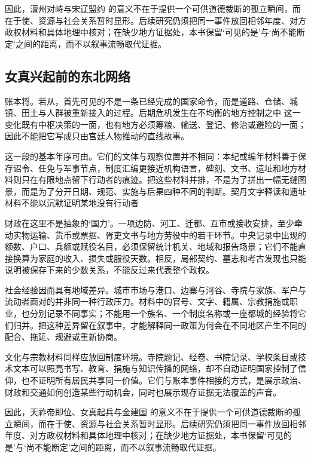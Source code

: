 因此，澶州对峙与宋辽盟约 的意义不在于提供一个可供道德裁断的孤立瞬间，而在于使、资源与社会关系暂时显形。后续研究仍须把同一事件放回相邻年度、对方政权材料和具体地理中核对；在缺少地方证据处，本书保留‘可见的是’与‘尚不能断定’之间的距离，而不以叙事流畅取代证据。

\subsection{女真兴起前的东北网络}

账本将。若从，首先可见的不是一条已经完成的国家命令，而是道路、仓储、城镇、田土与人群被重新接入的过程。后期危机发生在不均衡的地方控制之中 这一变化既有中枢决策的一面，也有地方必须筹粮、输送、登记、修治或避险的一面；因此不能把它写成只由宫廷人物推动的直线故事。

这一段的基本年序可由。它们的文体与观察位置并不相同：本纪或编年材料善于保存诏令、任免与军事节点，制度汇编更接近机构语言，碑刻、文书、遗址和地方材料则只在有限地点留下行动者的痕迹。把这些材料并排，不是为了拼出一幅无缝图景，而是为了分开日期、规范、实施与后果四种不同的判断。契丹文字释读和遗址材料不能以沉默证明某地没有行动者

财政在这里不是抽象的‘国力’。一项边防、河工、迁都、互市或接收安排，至少牵动实物运输、货币或票据、胥吏文书与地方劳役中的若干环节。中央记录中出现的额数、户口、兵额或赋役名目，必须保留统计机关、地域和报告场景；它们不能直接换算为家庭的收入、损失或服役天数。相反，局部契约、墓志和考古发现也只能说明被保存下来的少数关系，不能反过来代表整个政权。

社会经验因而具有地域差异。城市市场与港口、边寨与河谷、寺院与家族、军户与流动者面对的并非同一种行政压力。材料中的官号、文字、籍属、宗教捐施或职业，也分别记录不同事实；不能用一个族名、一个制度名称或一座都城的经验将它们归并。把这种差异留在叙事中，才能解释同一政策为何会在不同地区产生不同的配合、拖延、规避或重新协商。

文化与宗教材料同样应放回制度环境。寺院题记、经卷、书院记录、学校条目或技术文本可以照亮书写、教育、捐施与知识传播的网络，却不自动证明国家控制了信仰，也不证明所有居民共享同一价值。它们与账本事件相接的方式，是展示政治、财政和交通如何创造某些行动机会，同时也展示现存证据无法覆盖的声音。

因此，天祚帝即位、女真起兵与金建国 的意义不在于提供一个可供道德裁断的孤立瞬间，而在于使、资源与社会关系暂时显形。后续研究仍须把同一事件放回相邻年度、对方政权材料和具体地理中核对；在缺少地方证据处，本书保留‘可见的是’与‘尚不能断定’之间的距离，而不以叙事流畅取代证据。

